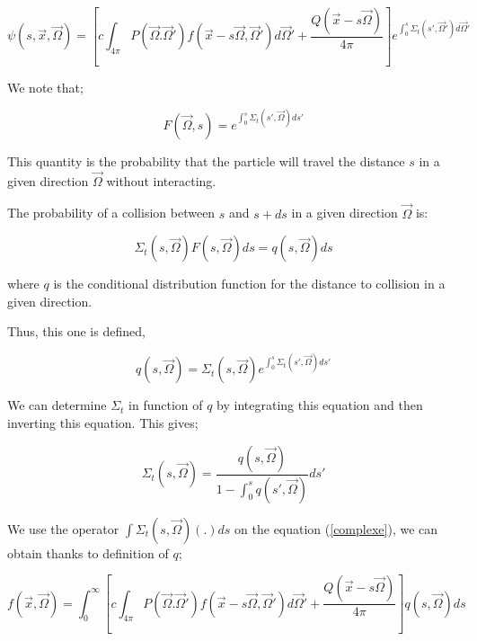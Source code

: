 \documentclass[a4paper, 12pt]{report}
\begin{document}
\begin{equation}\label{complexe}
\psi(s,\vec{x},\vec{\Omega}) = \left[ c \int_{4\pi} P(\vec{\Omega}.\vec{\Omega}')f(\vec{x}-s\vec{\Omega},\vec{\Omega}')d\vec{\Omega}' + \frac{Q(\vec{x}-s\vec{\Omega})}{4\pi} \right] e^{\int_0^s \Sigma_t(s',\vec{\Omega}')d\vec{\Omega}'}
\end{equation}

We note that;

\begin{equation}
F(\vec{\Omega},s) = e^{\int_0^s \Sigma_t(s',\vec{\Omega})ds'}
\end{equation}

This quantity is the probability that the particle will travel the distance $s$ in a given direction $\vec{\Omega}$ without interacting.

The probability of a collision between $s$ and $s + ds$ in a given direction $\vec{\Omega}$ is:

\begin{equation}
\Sigma_t(s,\vec{\Omega})F(s,\vec{\Omega}) ds = q(s,\vec{\Omega})ds
\end{equation}

where $q$ is the conditional distribution function for the distance to collision in a given direction.

Thus, this one is defined,

\begin{equation}
q(s,\vec{\Omega}) = \Sigma_t(s,\vec{\Omega})e^{\int_0^s \Sigma_t(s',\vec{\Omega})ds'}
\end{equation}

We can determine $\Sigma_t$ in function of $q$ by integrating this equation and then inverting this equation. This gives;

\begin{equation}
\Sigma_t(s,\vec{\Omega}) = \frac{q(s,\vec{\Omega})}{1-\int_0^s q(s',\vec{\Omega})}ds'
\end{equation}

We use the operator $\int \Sigma_t(s,\vec{\Omega})(.)ds$ on the equation (\ref{complexe}), we can obtain thanks to definition of $q$;

\begin{equation}
f(\vec{x},\vec{\Omega}) = \int_0^\infty \left[ c \int_{4\pi} P(\vec{\Omega}.\vec{\Omega}')f(\vec{x}-s\vec{\Omega},\vec{\Omega}')d\vec{\Omega}' + \frac{Q(\vec{x}-s\vec{\Omega})}{4\pi} \right] q(s,\vec{\Omega})ds
\end{equation}
\end{document}
